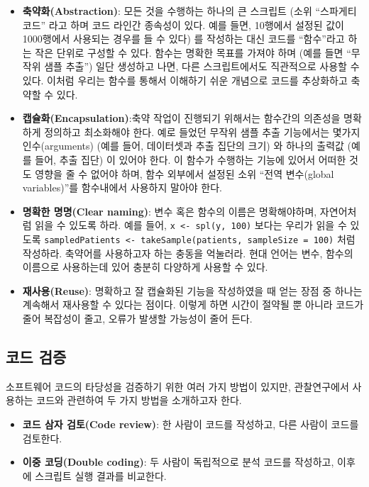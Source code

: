 \documentclass[10.5pt]{book}
\providecommand{\tightlist}{%
  \setlength{\itemsep}{0pt}\setlength{\parskip}{0pt}}
\theoremstyle{definition}
\theoremstyle{definition}
\theoremstyle{definition}
\theoremstyle{remark}
\begin{document}
\begin{itemize}
\tightlist
\item
  \textbf{축약화(Abstraction)}: 모든 것을 수행하는 하나의 큰 스크립트
  (소위 ``스파게티 코드'' 라고 하며 코드 라인간 종속성이 있다. 예를
  들면, 10행에서 설정된 값이 1000행에서 사용되는 경우를 들 수 있다) 를
  작성하는 대신 코드를 ``함수''라고 하는 작은 단위로 구성할 수 있다.
  함수는 명확한 목표를 가져야 하며 (예를 들면 ``무작위 샘플 추출'') 일단
  생성하고 나면, 다른 스크립트에서도 직관적으로 사용할 수 있다. 이처럼
  우리는 함수를 통해서 이해하기 쉬운 개념으로 코드를 추상화하고 축약할
  수 있다.
\item
  \textbf{캡슐화(Encapsulation)}:축약 작업이 진행되기 위해서는 함수간의
  의존성을 명확하게 정의하고 최소화해야 한다. 예로 들었던 무작위 샘플
  추출 기능에서는 몇가지 인수(arguments) (예를 들어, 데이터셋과 추출
  집단의 크기) 와 하나의 출력값 (예를 들어, 추출 집단) 이 있어야 한다.
  이 함수가 수행하는 기능에 있어서 어떠한 것도 영향을 줄 수 없어야 하며,
  함수 외부에서 설정된 소위 ``전역 변수(global variables)''를 함수내에서
  사용하지 말아야 한다.
\item
  \textbf{명확한 명명(Clear naming)}: 변수 혹은 함수의 이름은
  명확해야하며, 자연어처럼 읽을 수 있도록 하라. 예를 들어,
  \texttt{x\ \textless{}-\ spl(y,\ 100)} 보다는 우리가 읽을 수 있도록
  \texttt{sampledPatients\ \textless{}-\ takeSample(patients,\ sampleSize\ =\ 100)}
  처럼 작성하라. 축약어를 사용하고자 하는 충동을 억눌러라. 현대 언어는
  변수, 함수의 이름으로 사용하는데 있어 충분히 다양하게 사용할 수 있다.
\item
  \textbf{재사용(Reuse)}: 명확하고 잘 캡슐화된 기능을 작성하였을 때 얻는
  장점 중 하나는 계속해서 재사용할 수 있다는 점이다. 이렇게 하면 시간이
  절약될 뿐 아니라 코드가 줄어 복잡성이 줄고, 오류가 발생할 가능성이
  줄어 든다.
\end{itemize}

\subsection{코드 검증}\label{-}

소프트웨어 코드의 타당성을 검증하기 위한 여러 가지 방법이 있지만,
관찰연구에서 사용하는 코드와 관련하여 두 가지 방법을 소개하고자 한다.

\begin{itemize}
\tightlist
\item
  \textbf{코드 삼자 검토(Code review)}: 한 사람이 코드를 작성하고, 다른
  사람이 코드를 검토한다.
\item
  \textbf{이중 코딩(Double coding)}: 두 사람이 독립적으로 분석 코드를
  작성하고, 이후에 스크립트 실행 결과를 비교한다.
\end{itemize}
\end{document}
